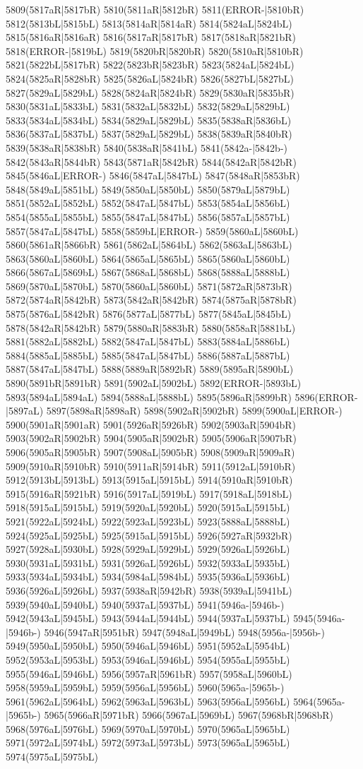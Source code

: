 5809(5817aR|5817bR) 5810(5811aR|5812bR) 5811(ERROR-|5810bR) 5812(5813bL|5815bL) 5813(5814aR|5814aR) 5814(5824aL|5824bL) 5815(5816aR|5816aR) 5816(5817aR|5817bR) 5817(5818aR|5821bR) 5818(ERROR-|5819bL) 5819(5820bR|5820bR) 5820(5810aR|5810bR) 5821(5822bL|5817bR) 5822(5823bR|5823bR) 5823(5824aL|5824bL) 5824(5825aR|5828bR) 5825(5826aL|5824bR) 5826(5827bL|5827bL) 5827(5829aL|5829bL) 5828(5824aR|5824bR) 5829(5830aR|5835bR) 5830(5831aL|5833bL) 5831(5832aL|5832bL) 5832(5829aL|5829bL) 5833(5834aL|5834bL) 5834(5829aL|5829bL) 5835(5838aR|5836bL) 5836(5837aL|5837bL) 5837(5829aL|5829bL) 5838(5839aR|5840bR) 5839(5838aR|5838bR) 5840(5838aR|5841bL) 5841(5842a-|5842b-) 5842(5843aR|5844bR) 5843(5871aR|5842bR) 5844(5842aR|5842bR) 5845(5846aL|ERROR-) 5846(5847aL|5847bL) 5847(5848aR|5853bR) 5848(5849aL|5851bL) 5849(5850aL|5850bL) 5850(5879aL|5879bL) 5851(5852aL|5852bL) 5852(5847aL|5847bL) 5853(5854aL|5856bL) 5854(5855aL|5855bL) 5855(5847aL|5847bL) 5856(5857aL|5857bL) 5857(5847aL|5847bL) 5858(5859bL|ERROR-) 5859(5860aL|5860bL) 5860(5861aR|5866bR) 5861(5862aL|5864bL) 5862(5863aL|5863bL) 5863(5860aL|5860bL) 5864(5865aL|5865bL) 5865(5860aL|5860bL) 5866(5867aL|5869bL) 5867(5868aL|5868bL) 5868(5888aL|5888bL) 5869(5870aL|5870bL) 5870(5860aL|5860bL) 5871(5872aR|5873bR) 5872(5874aR|5842bR) 5873(5842aR|5842bR) 5874(5875aR|5878bR) 5875(5876aL|5842bR) 5876(5877aL|5877bL) 5877(5845aL|5845bL) 5878(5842aR|5842bR) 5879(5880aR|5883bR) 5880(5858aR|5881bL) 5881(5882aL|5882bL) 5882(5847aL|5847bL) 5883(5884aL|5886bL) 5884(5885aL|5885bL) 5885(5847aL|5847bL) 5886(5887aL|5887bL) 5887(5847aL|5847bL) 5888(5889aR|5892bR) 5889(5895aR|5890bL) 5890(5891bR|5891bR) 5891(5902aL|5902bL) 5892(ERROR-|5893bL) 5893(5894aL|5894aL) 5894(5888aL|5888bL) 5895(5896aR|5899bR) 5896(ERROR-|5897aL) 5897(5898aR|5898aR) 5898(5902aR|5902bR) 5899(5900aL|ERROR-) 5900(5901aR|5901aR) 5901(5926aR|5926bR) 5902(5903aR|5904bR) 5903(5902aR|5902bR) 5904(5905aR|5902bR) 5905(5906aR|5907bR) 5906(5905aR|5905bR) 5907(5908aL|5905bR) 5908(5909aR|5909aR) 5909(5910aR|5910bR) 5910(5911aR|5914bR) 5911(5912aL|5910bR) 5912(5913bL|5913bL) 5913(5915aL|5915bL) 5914(5910aR|5910bR) 5915(5916aR|5921bR) 5916(5917aL|5919bL) 5917(5918aL|5918bL) 5918(5915aL|5915bL) 5919(5920aL|5920bL) 5920(5915aL|5915bL) 5921(5922aL|5924bL) 5922(5923aL|5923bL) 5923(5888aL|5888bL) 5924(5925aL|5925bL) 5925(5915aL|5915bL) 5926(5927aR|5932bR) 5927(5928aL|5930bL) 5928(5929aL|5929bL) 5929(5926aL|5926bL) 5930(5931aL|5931bL) 5931(5926aL|5926bL) 5932(5933aL|5935bL) 5933(5934aL|5934bL) 5934(5984aL|5984bL) 5935(5936aL|5936bL) 5936(5926aL|5926bL) 5937(5938aR|5942bR) 5938(5939aL|5941bL) 5939(5940aL|5940bL) 5940(5937aL|5937bL) 5941(5946a-|5946b-) 5942(5943aL|5945bL) 5943(5944aL|5944bL) 5944(5937aL|5937bL) 5945(5946a-|5946b-) 5946(5947aR|5951bR) 5947(5948aL|5949bL) 5948(5956a-|5956b-) 5949(5950aL|5950bL) 5950(5946aL|5946bL) 5951(5952aL|5954bL) 5952(5953aL|5953bL) 5953(5946aL|5946bL) 5954(5955aL|5955bL) 5955(5946aL|5946bL) 5956(5957aR|5961bR) 5957(5958aL|5960bL) 5958(5959aL|5959bL) 5959(5956aL|5956bL) 5960(5965a-|5965b-) 5961(5962aL|5964bL) 5962(5963aL|5963bL) 5963(5956aL|5956bL) 5964(5965a-|5965b-) 5965(5966aR|5971bR) 5966(5967aL|5969bL) 5967(5968bR|5968bR) 5968(5976aL|5976bL) 5969(5970aL|5970bL) 5970(5965aL|5965bL) 5971(5972aL|5974bL) 5972(5973aL|5973bL) 5973(5965aL|5965bL) 5974(5975aL|5975bL) 